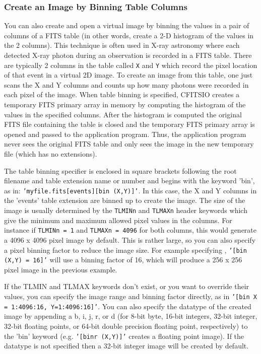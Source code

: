 \documentclass[11pt]{article}
\begin{document}
\subsubsection{Create an Image by Binning Table Columns}

You can also create and open a virtual image by binning the values in a
pair of columns of a FITS table (in other words, create a 2-D histogram
of the values in the 2 columns).  This technique is often used in X-ray
astronomy where each detected X-ray photon during an observation is
recorded in a FITS table.  There are typically 2 columns in the table
called  {\tt X} and {\tt Y} which record the pixel location of that
event in a virtual 2D image.  To create an image from this table, one
just scans the X and Y columns and counts up how many photons were
recorded in each pixel of the image.  When table binning is specified,
CFITSIO creates a temporary FITS primary array in memory by computing
the histogram of the values in the specified columns.  After the
histogram is computed the original FITS file containing the table is
closed and the temporary FITS primary array is opened and passed to the
application program.  Thus, the application program never sees the
original FITS table and only sees the image in the new temporary file
(which has no extensions).

The table binning specifier is enclosed in square brackets following
the root filename and table extension name or number and begins with
the keyword 'bin', as in: \newline  
{\tt 'myfile.fits[events][bin (X,Y)]'}. In
this case, the X and Y columns in the 'events' table extension are
binned up to create the image.  The size of the image is usually
determined by the {\tt TLMINn} and {\tt TLMAXn} header keywords which
give the minimum and maximum allowed pixel values in the columns.  For
instance if {\tt TLMINn = 1} and {\tt TLMAXn = 4096} for both columns, this would
generate a 4096 x 4096 pixel image by default.  This is rather large,
so you can also specify a pixel binning factor to reduce the image
size.  For example specifying ,  {\tt '[bin (X,Y) = 16]'} will use a
binning factor of 16, which will produce a 256 x 256 pixel image in the
previous example.

If the TLMIN and TLMAX keywords don't exist, or you want to override
their values,  you can specify the image range and binning factor
directly, as in {\tt '[bin X = 1:4096:16, Y=1:4096:16]'}.  You can also
specify the datatype of the created image by appending a b, i, j, r, or
d (for 8-bit byte, 16-bit integers, 32-bit integer, 32-bit floating
points, or 64-bit double precision floating point, respectively)  to
the 'bin' keyword (e.g. {\tt '[binr (X,Y)]'} creates a floating point
image).  If the datatype is not specified then a 32-bit integer image
will be created by default.
\end{document}
